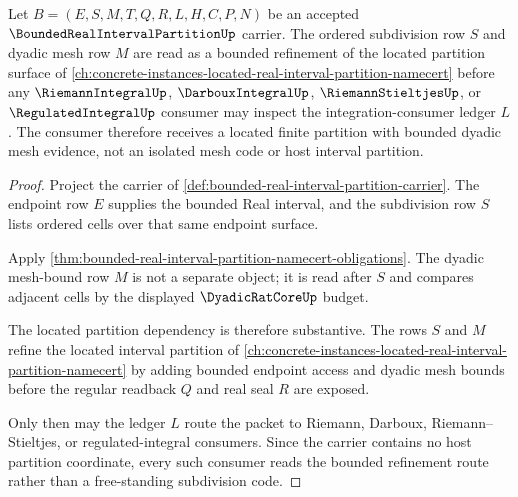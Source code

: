 \begin{theorem}
\label{thm:bounded-real-interval-partition-mesh-consumer-readiness}
Let $B=(E,S,M,T,Q,R,L,H,C,P,N)$ be an accepted $\BoundedRealIntervalPartitionUp$ carrier. The ordered subdivision row $S$ and dyadic mesh row $M$ are read as a bounded refinement of the located partition surface of \autoref{ch:concrete-instances-located-real-interval-partition-namecert} before any $\RiemannIntegralUp$, $\DarbouxIntegralUp$, $\RiemannStieltjesUp$, or $\RegulatedIntegralUp$ consumer may inspect the integration-consumer ledger $L$. The consumer therefore receives a located finite partition with bounded dyadic mesh evidence, not an isolated mesh code or host interval partition.
\end{theorem}
\begin{proof}
Project the carrier of \autoref{def:bounded-real-interval-partition-carrier}. The endpoint row $E$ supplies the bounded Real interval, and the subdivision row $S$ lists ordered cells over that same endpoint surface.

Apply \autoref{thm:bounded-real-interval-partition-namecert-obligations}. The dyadic mesh-bound row $M$ is not a separate object; it is read after $S$ and compares adjacent cells by the displayed $\DyadicRatCoreUp$ budget.

The located partition dependency is therefore substantive. The rows $S$ and $M$ refine the located interval partition of \autoref{ch:concrete-instances-located-real-interval-partition-namecert} by adding bounded endpoint access and dyadic mesh bounds before the regular readback $Q$ and real seal $R$ are exposed.

Only then may the ledger $L$ route the packet to Riemann, Darboux, Riemann--Stieltjes, or regulated-integral consumers. Since the carrier contains no host partition coordinate, every such consumer reads the bounded refinement route rather than a free-standing subdivision code.
\end{proof}

